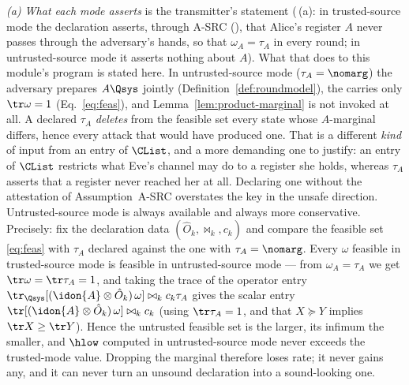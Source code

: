 
\begin{remark}\label{rem:modes-da1}
\emph{(a) What each mode asserts} is the transmitter's statement
(\,(a): in trusted-source mode the
declaration asserts, through A-SRC
(), that Alice's register $A$ never passes
through the adversary's hands, so that $\omega_A=\tau_A$ in every round;
in untrusted-source mode it asserts nothing about $A$). What that does to
this module's program is stated here. In untrusted-source mode
($\tau_A=\nomarg$) the adversary prepares $A\Qsys$ jointly
(Definition~\ref{def:roundmodel}), the  carries only
$\tr\omega=1$ (Eq.~\eqref{eq:feas}), and Lemma~\ref{lem:product-marginal} is
not invoked at all. A declared $\tau_A$ \emph{deletes} from the feasible set
every state whose $A$-marginal differs, hence every attack that would have
produced one. That is a different \emph{kind} of input from an entry of
$\CList$, and a more demanding one to justify: an entry of $\CList$
restricts what Eve's channel may do to a register she holds, whereas
$\tau_A$ asserts that a register never reached her at all. Declaring one
without the attestation of Assumption~A-SRC overstates the key in the
unsafe direction. Untrusted-source mode is always available and always
more conservative. Precisely: fix the declaration data
$(\hat O_k,\bowtie_k,c_k)$ and compare the feasible set \eqref{eq:feas}
with $\tau_A$ declared against the one with $\tau_A=\nomarg$. Every
$\omega$ feasible in trusted-source mode is feasible in untrusted-source
mode --- from $\omega_A=\tau_A$ we get $\tr\omega=\tr\tau_A=1$, and taking
the trace of the operator entry
$\tr_{\Qsys}[(\idon{A}\otimes\hat O_k)\,\omega]\bowtie_k c_k\tau_A$
gives the scalar entry
$\tr[(\idon{A}\otimes\hat O_k)\,\omega]\bowtie_k c_k$ (using
$\tr\tau_A=1$, and that $X\succeq Y$ implies $\tr X\ge\tr Y$). Hence
the untrusted feasible set is the larger, its infimum the smaller, and
$\hlow$ computed in untrusted-source mode never exceeds the
trusted-mode value. Dropping the marginal therefore loses rate; it
never gains any, and it can never turn an unsound declaration into a
sound-looking one.


\end{remark}
